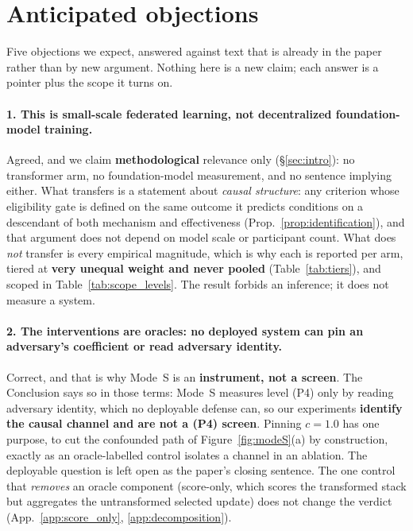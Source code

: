 \documentclass{article}
\begin{document}
\section{Anticipated objections}
\label{app:objections}

Five objections we expect, answered against text that is already in the paper rather than by new
argument. Nothing here is a new claim; each answer is a pointer plus the scope it turns on.

\paragraph{1. This is small-scale federated learning, not decentralized foundation-model training.}
Agreed, and we claim \textbf{methodological} relevance only (\S\ref{sec:intro}): no transformer arm, no
foundation-model measurement, and no sentence implying either. What transfers is a statement about
\emph{causal structure}: any criterion whose eligibility gate is defined on the same outcome it
predicts conditions on a descendant of both mechanism and effectiveness (Prop.~\ref{prop:identification}), and
that argument does not depend on model scale or participant count. What does \emph{not} transfer is
every empirical magnitude, which is why each is reported per arm, tiered at \textbf{very unequal
weight and never pooled} (Table~\ref{tab:tiers}), and scoped in Table~\ref{tab:scope_levels}. The
result forbids an inference; it does not measure a system.

\paragraph{2. The interventions are oracles: no deployed system can pin an adversary's coefficient or
read adversary identity.} Correct, and that is why Mode~S is an \textbf{instrument, not a screen}. The
Conclusion says so in those terms: Mode~S measures level (P4) only by reading adversary identity, which
no deployable defense can, so our experiments \textbf{identify the causal channel and are not a (P4)
screen}. Pinning $c{=}1.0$ has one purpose, to cut the confounded path of Figure~\ref{fig:modeS}(a) by
construction, exactly as an oracle-labelled control isolates a channel in an ablation. The deployable
question is left open as the paper's closing sentence. The one control that \emph{removes} an oracle
component (score-only, which scores the transformed stack but aggregates the untransformed selected
update) does not change the verdict (App.~\ref{app:score_only}, \ref{app:decomposition}).
\end{document}
